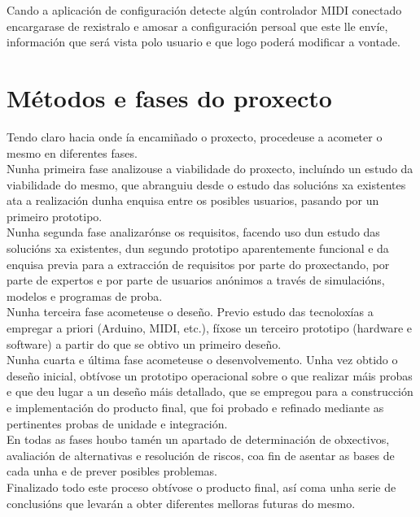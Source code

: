  Cando a aplicación de configuración detecte algún controlador MIDI conectado
 encargarase de rexistralo e amosar a configuración persoal que este lle envíe,
 información que será vista polo usuario e que logo poderá modificar a vontade.
 
\section{Métodos e fases do proxecto}

 Tendo claro hacia onde ía encamiñado o proxecto, procedeuse a acometer o mesmo
 en diferentes fases. \\

 Nunha primeira fase analizouse a viabilidade do proxecto, incluíndo un estudo
 da viabilidade do mesmo, que abranguiu desde o estudo das solucións xa
 existentes ata a realización dunha enquisa entre os posibles usuarios, pasando
 por un primeiro prototipo. \\

 Nunha segunda fase analizarónse os requisitos, facendo uso dun estudo das
 solucións xa existentes, dun segundo prototipo aparentemente funcional e da
 enquisa previa para a extracción de requisitos por parte do proxectando, por
 parte de expertos e por parte de usuarios anónimos a través de simulacións,
 modelos e programas de proba. \\

 Nunha terceira fase acometeuse o deseño. Previo estudo das tecnoloxías a
 empregar a priori (Arduino, MIDI, etc.), fíxose un terceiro prototipo
 (hardware e software) a partir do que se obtivo un primeiro deseño.\\

 Nunha cuarta e última fase acometeuse o desenvolvemento. Unha vez obtido o
 deseño inicial, obtívose un prototipo operacional sobre o que realizar máis
 probas e que deu lugar a un deseño máis detallado, que se empregou para a
 construcción e implementación do producto final, que foi probado e refinado
 mediante as pertinentes probas de unidade e integración. \\

 En todas as fases houbo tamén un apartado de determinación de obxectivos,
 avaliación de alternativas e resolución de riscos, coa fin de asentar as bases
 de cada unha e de prever posibles problemas. \\

 Finalizado todo este proceso obtívose o producto final, así coma unha serie de
 conclusións que levarán a obter diferentes melloras futuras do mesmo.


